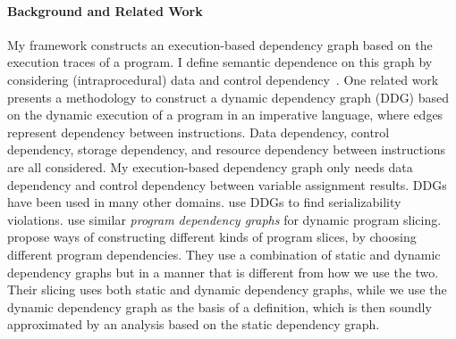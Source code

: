 
 \paragraph*{Background and Related Work}
 {
My framework constructs an execution-based dependency graph based on the execution traces of a program. I define semantic dependence on this graph by considering (intraprocedural) data and control dependency~\cite{bilardi1996framework,cytron1991efficiently,pollock1989incremental}. 
One related work 
\cite{austin1992dynamic} presents a methodology to construct a dynamic dependency graph (DDG) based on the dynamic execution of a program in an imperative language, where edges represent dependency between instructions. Data dependency, control dependency, storage dependency, and resource dependency between instructions are all considered. My execution-based dependency graph only needs data dependency and control dependency between variable assignment results. 
%
DDGs have been used in many other domains. \cite{nagar2018automated} use DDGs to find serializability violations. \cite{hammer2006dynamic} use similar \emph{program dependency graphs} \cite{ferrante1987program} for dynamic program slicing.
\cite{mastroeni2008data} propose ways of constructing different kinds of program slices, by choosing different program dependencies. 
They use a combination of 
static and dynamic dependency graphs but in a manner that is different from how we use the two. Their slicing uses both static and dynamic dependency graphs, while we use the dynamic dependency graph as the basis of a definition, which is then soundly approximated by an analysis based on the static dependency graph.}

